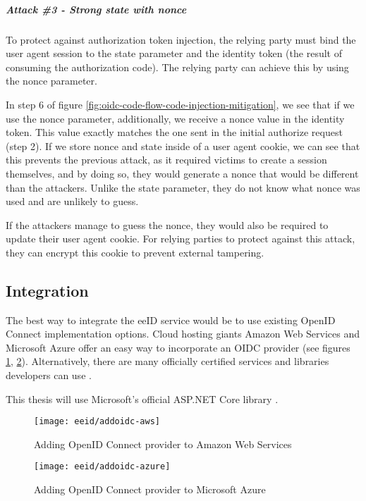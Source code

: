 \subparagraph{Attack \#3 - Strong state with nonce}

To protect against authorization token injection, the relying party must bind the user agent session to the state parameter and the identity token (the result of consuming the authorization code). The relying party can achieve this by using the nonce parameter.

In step 6 of figure \ref{fig:oidc-code-flow-code-injection-mitigation}, we see that if we use the nonce parameter, additionally, we receive a nonce value in the identity token. This value exactly matches the one sent in the initial {authorize} request (step 2). If we store nonce and state inside of a user agent cookie, we can see that this prevents the previous attack, as it required victims to create a session themselves, and by doing so, they would generate a nonce that would be different than the attackers. Unlike the state parameter, they do not know what nonce was used and are unlikely to guess.

If the attackers manage to guess the nonce, they would also be required to update their user agent cookie. For {relying parties} to protect against this attack, they can encrypt this cookie to prevent external tampering.

\subsection{Integration}

The best way to integrate the eeID service would be to use existing OpenID Connect implementation options. Cloud hosting giants Amazon Web Services and Microsoft Azure offer an easy way to incorporate an OIDC provider (see figures \ref{fig:addoidc-aws}, \ref{fig:addoidc-azure}). Alternatively, there are many officially certified services and libraries developers can use \cite{oidc-certified}.

This thesis will use Microsoft's official ASP.NET Core library \cite{ms-auth-oidc-src}.

\begin{figure}
  \centering
  \texttt{[image: eeid/addoidc-aws]}
  \caption{Adding OpenID Connect provider to Amazon Web Services}
  \label{fig:addoidc-aws}
\end{figure}

\begin{figure}
  \centering
  \texttt{[image: eeid/addoidc-azure]}
  \caption{Adding OpenID Connect provider to Microsoft Azure}
  \label{fig:addoidc-azure}
\end{figure}

